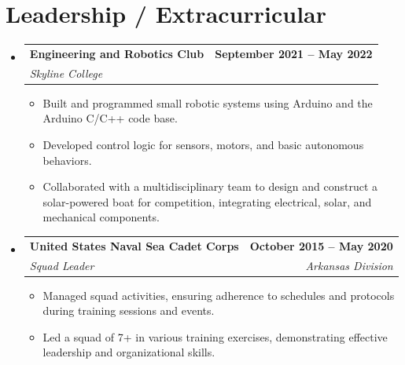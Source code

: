 \documentclass[letterpaper,11pt]{article}
\makeatletter
\newcommand{\resumeItem}[1]{
  \item\small{
    {#1\vspace{-2pt}}
  }
}
\newcommand{\resumeSubheading}[4]{
  \vspace{-2pt}\item
    \begin{tabular*}{\textwidth}[t]{l@{\extracolsep{\fill}}r}
      \textbf{#1} & \textbf{#2} \\
      \textit{\small#3} & \textit{\small #4} \\
    \end{tabular*}\vspace{-7pt}
}
\newcommand{\resumeSubHeadingListStart}{\begin{itemize}[leftmargin=0in, label={}]}
\newcommand{\resumeSubHeadingListEnd}{\end{itemize}}
\newcommand{\resumeItemListStart}{\begin{itemize}}
\newcommand{\resumeItemListEnd}{\end{itemize}\vspace{-5pt}}
\makeatother
\begin{document}
\section{Leadership / Extracurricular}
  \resumeSubHeadingListStart

    \resumeSubheading
      {Engineering and Robotics Club}{September 2021 -- May 2022}
      {Skyline College}{}
      \resumeItemListStart
        \resumeItem{Built and programmed small robotic systems using Arduino and the Arduino C/C++ code base.}
        \resumeItem{Developed control logic for sensors, motors, and basic autonomous behaviors.}
        \resumeItem{Collaborated with a multidisciplinary team to design and construct a solar-powered boat for competition, integrating electrical, solar, and mechanical components.}
      \resumeItemListEnd

    \resumeSubheading
      {United States Naval Sea Cadet Corps}{October 2015 -- May 2020}
      {Squad Leader}{Arkansas Division}
      \resumeItemListStart
        \resumeItem{Managed squad activities, ensuring adherence to schedules and protocols during training sessions and events.}
        \resumeItem{Led a squad of 7+ in various training exercises, demonstrating effective leadership and organizational skills.}
      \resumeItemListEnd

  \resumeSubHeadingListEnd
\end{document}
